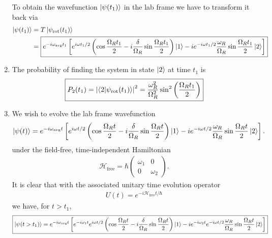 \documentclass{article}
\theoremstyle{definition}
\newcommand{\ham}{\mathcal{H}}
\newcommand{\f}[2]{\frac{#1}{#2}}
\newcommand{\lp}{\left(}
\newcommand{\rp}{\right)}
\newcommand{\lb}{\left[}
\newcommand{\rb}{\right]}
\begin{document}
\begin{enumerate}[label=\alph*)]
	To obtain the wavefunction $\ket{\psi(t_1)}$ in the lab frame we have to transform it back via
	\begin{align*}
	\ket{\psi(t_1)} &= T \ket{\psi_\text{rot}(t_1)}\\
	&= \boxed{e^{-i\omega_\text{avg}t_1 }\lb e^{i\omega t_1/2} \lp \cos\f{\Omega_R t_1}{2} - i\f{\delta}{\Omega_R} \sin\f{\Omega_R t_1}{2}   \rp \ket{1} - i e^{-i\omega t_1/2}\f{\omega_R}{\Omega_R} \sin\f{\Omega_R t_1}{2} \ket{2}\rb}
	\end{align*}
	
	
	
	
	
	
	
	
	\item 
	
	
	The probability of finding the system in state $\ket{2}$ at time $t_1$ is 
	\begin{align*}
	\boxed{P_2(t_1) = \abs{\bra{2}\ket{\psi_\text{rot}(t_1)}}^2 = \f{\omega_R^2}{\Omega_R^2}\sin^2 \lp \f{\Omega_R t_1}{2} \rp}
	\end{align*}
	
	
	
	
	\item We wish to evolve the lab frame wavefunction
	\begin{align*}
	\ket{\psi(t)} = e^{-i\omega_\text{avg}t }\lb e^{i\omega t/2} \lp \cos\f{\Omega_R t}{2} - i\f{\delta}{\Omega_R} \sin\f{\Omega_R t}{2}   \rp \ket{1} - i e^{-i\omega t/2}\f{\omega_R}{\Omega_R} \sin\f{\Omega_R t}{2} \ket{2}\rb.
	\end{align*}
	under the field-free, time-independent Hamiltonian 
	\begin{align*}
	\ham_\text{free} = \hbar \begin{pmatrix}
	\omega_1 & 0 \\ 0 & \omega_2
	\end{pmatrix}.
	\end{align*}
	It is clear that with the associated unitary time evolution operator
	\begin{align*}
	U(t) = e^{-i \ham_\text{free} t /\hbar} 
	\end{align*}
	we have, for $t > t_1$,
	\begin{align*}
	\boxed{\ket{\psi(t > t_1)} = e^{-i\omega_\text{avg}t }\lb e^{-i\omega_1 t} e^{i\omega t/2} \lp \cos\f{\Omega_R t}{2} - i\f{\delta}{\Omega_R} \sin\f{\Omega_R t}{2}   \rp \ket{1} - i e^{-i\omega_2 t} e^{-i\omega t/2}\f{\omega_R}{\Omega_R} \sin\f{\Omega_R t}{2} \ket{2}\rb}
	\end{align*}
\end{enumerate}
	
\end{document}
